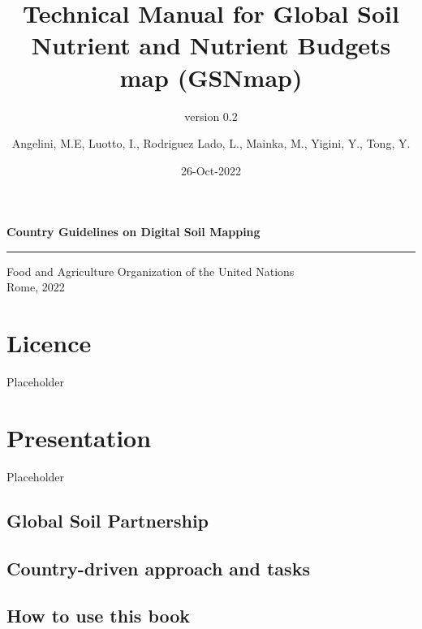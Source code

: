 \documentclass[
  10pt,
  b5paper,
  oneside]{book}
\title{
Technical Manual for Global Soil Nutrient and Nutrient Budgets map (GSNmap)}
\subtitle{version 0.2}
\author{Angelini, M.E, Luotto, I., Rodriguez Lado, L., Mainka, M., Yigini, Y., Tong, Y.}
\date{26-Oct-2022}
\newcommand\blankpage{%
    \null
    \thispagestyle{empty}%
    \addtocounter{page}{-1}%
    \newpage}
\begin{document}
\maketitle

\pagestyle{plain}

\afterpage{\blankpage}
\thispagestyle{empty}
\begin{titlepage}
    \begin{center}
        \vspace*{4cm}
        \Large

        \textcolor{astral}{\textbf{Country Guidelines on Digital Soil Mapping\\}}
        \vspace{0.5cm}
        \normalsize
        \vfill
        \noindent
        {\color{astral}\rule{\linewidth}{0.5mm} }

        Food and Agriculture Organization of the United Nations\\
	Rome, 2022
    \end{center}
\end{titlepage}



\hypertarget{licence}{%
\chapter*{Licence}\label{licence}}

Placeholder

\hypertarget{presentation}{%
\chapter{Presentation}\label{presentation}}

Placeholder

\hypertarget{global-soil-partnership}{%
\section{Global Soil Partnership}\label{global-soil-partnership}}

\hypertarget{country-driven-approach-and-tasks}{%
\section{Country-driven approach and tasks}\label{country-driven-approach-and-tasks}}

\hypertarget{how-to-use-this-book}{%
\section{How to use this book}\label{how-to-use-this-book}}
\end{document}

